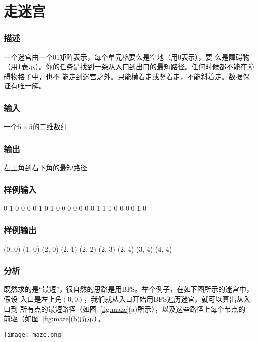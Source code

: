 \section{走迷宫} %

\subsubsection{描述}
一个迷宫由一个01矩阵表示，每个单元格要么是空地（用0表示），要
么是障碍物（用1表示）。你的任务是找到一条从入口到出口的最短路径。任何时候都不能在障碍物格子中，也不
能走到迷宫之外。只能横着走或竖着走，不能斜着走。数据保证有唯一解。

\subsubsection{输入}
一个$5 \times 5$的二维数组

\subsubsection{输出}
左上角到右下角的最短路径

\subsubsection{样例输入}
\begin{Code}
0 1 0 0 0
0 1 0 1 0
0 0 0 0 0
0 1 1 1 0
0 0 0 1 0
\end{Code}

\subsubsection{样例输出}
(0, 0)
(1, 0)
(2, 0)
(2, 1)
(2, 2)
(2, 3)
(2, 4)
(3, 4)
(4, 4)

\subsubsection{分析}
既然求的是“最短”，很自然的思路是用BFS。举个例子，在如下图所示的迷宫中，假设
入口是左上角$(0,0)$，我们就从入口开始用BFS遍历迷宫，就可以算出从入口到
所有点的最短路径（如图~\ref{fig:maze}(a)所示），以及这些路径上每个节点的
前驱（如图~\ref{fig:maze}(b)所示）。

\begin{center}
\texttt{[image: maze.png]}\\
\label{fig:maze}
\end{center}

